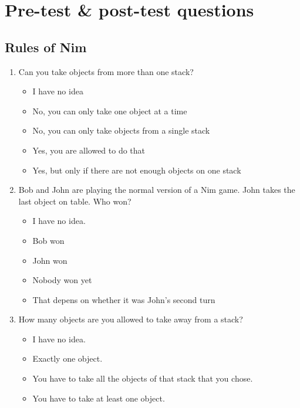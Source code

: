 \section{Pre-test \& post-test questions}
\subsection{Rules of Nim}
\begin{framed}
\begin{enumerate}
	\item Can you take objects from more than one stack?
		\begin{itemize}
			\item I have no idea
			\item No, you can only take one object at a time
			\item No, you can only take objects from a single stack
			\item Yes, you are allowed to do that
			\item Yes, but only if there are not enough objects on one stack
		\end{itemize}
	\item Bob and John are playing the normal version of a Nim game. John takes
		the last object on table. Who won?
		\begin{itemize}
			\item I have no idea.
			\item Bob won
			\item John won
			\item Nobody won yet
			\item That depens on whether it was John's second turn
		\end{itemize}
	\item How many objects are you allowed to take away from a stack?
		\begin{itemize}
			\item I have no idea.
			\item Exactly one object.
			\item You have to take all the objects of that stack that you chose.
			\item You have to take at least one object.
		\end{itemize}
\end{enumerate}
\end{framed}
